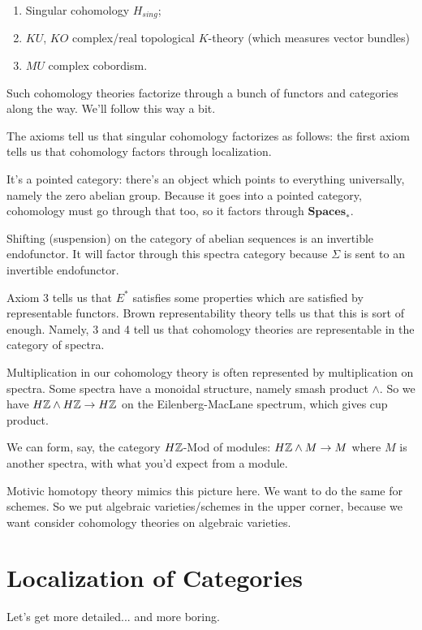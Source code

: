 \documentclass[../MH_Total.tex]{subfiles}
\begin{document}
\begin{example}
	\begin{enumerate}
		\item Singular cohomology $H_{sing}$;
		\item $KU$, $KO$ complex/real topological $K$-theory (which measures vector bundles)
		\item $MU$ complex cobordism.
	\end{enumerate}
\end{example}

Such cohomology theories factorize through a bunch of functors and categories along the way. We'll follow this way a bit.

The axioms tell us that singular cohomology factorizes as follows: the first axiom tells us that cohomology factors through localization. 

It's a pointed category: there's an object which points to everything universally, namely the zero abelian group. Because it goes into a pointed category, cohomology must go through that too, so it factors through $\mathbf{Spaces}_*$. 

Shifting (suspension) on the category of abelian sequences is an invertible endofunctor. It will factor through this spectra category because $\Sigma$ is sent to an invertible endofunctor. 

Axiom 3 tells us that $E^*$ satisfies some properties which are satisfied by representable functors. Brown representability theory tells us that this is sort of enough. Namely, 3 and 4 tell us that cohomology theories are representable in the category of spectra.

Multiplication in our cohomology theory is often represented by multiplication on spectra. Some spectra have a monoidal structure, namely smash product $\wedge$. So we have $H\mathbb{Z} \wedge H\mathbb{Z} \to H\mathbb{Z}$ on the Eilenberg-MacLane spectrum, which gives cup product.

We can form, say, the category $H\mathbb{Z}$-Mod of modules: $H\mathbb{Z} \wedge M \to M$ where $M$ is another spectra, with what you'd expect from a module.

Motivic homotopy theory mimics this picture here. We want to do the same for schemes. So we put algebraic varieties/schemes in the upper corner, because we want consider cohomology theories on algebraic varieties.

\section{Localization of Categories}
Let's get more detailed... and more boring.
\end{document}
